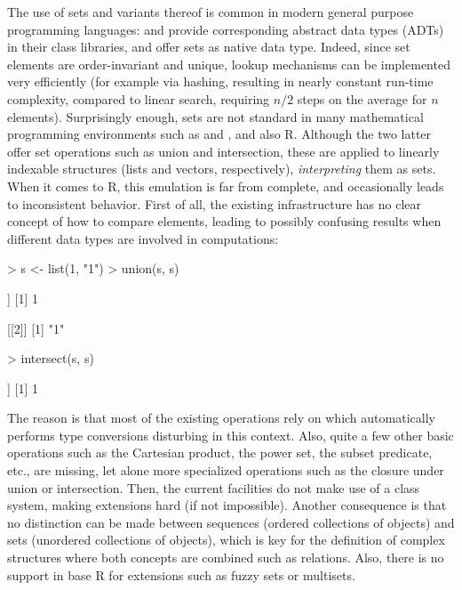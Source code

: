 \documentclass[article]{jss}
\newcommand\R{\textsf{R}}
\newcommand{\codefun}[1]{\code{#1()}}
\begin{document}
The use of sets and variants thereof is common in modern general purpose
programming languages:   and 
provide corresponding abstract data types (ADTs) in their class
libraries,  and 
offer sets as native data type.
Indeed, since set elements are order-invariant and unique,
lookup mechanisms can be implemented very efficiently (for example via
hashing, resulting in nearly constant run-time complexity, compared to linear
search, requiring $n/2$ steps on the average for $n$ elements).
Surprisingly enough, sets are not standard in many
mathematical programming environments such as  and
, and also \R. Although the two latter offer
set operations such as union and intersection, these are applied to
linearly indexable structures (lists and vectors, respectively),
\emph{interpreting} them as sets. When it comes to \R,
this emulation is far from complete, and occasionally leads to inconsistent
behavior. First of all, the existing infrastructure has no clear concept
of how to compare elements, leading to possibly confusing
results when different data types are involved in
computations:
\begin{Schunk}
\begin{Sinput}
> s <- list(1, "1")
> union(s, s)
\end{Sinput}
\begin{Soutput}
[[1]]
[1] 1

[[2]]
[1] "1"
\end{Soutput}
\begin{Sinput}
> intersect(s, s)
\end{Sinput}
\begin{Soutput}
[[1]]
[1] 1
\end{Soutput}
\end{Schunk}
The reason is that most of the existing operations rely on
\codefun{match} which automatically performs type conversions
disturbing in this context.
Also, quite a few other basic operations such as
the Cartesian product, the power set, the subset predicate, etc., are
missing, let alone more specialized operations such as
the closure under union or intersection.
Then, the current facilities do not make use of a class
system, making extensions hard (if not impossible).  Another consequence
is that no distinction can be made between sequences (ordered
collections of objects) and sets (unordered collections of objects),
which is key for the definition of complex structures
where both concepts are combined such as relations.
Also, there is no support in base \R{} for extensions such as fuzzy sets
or multisets.
\end{document}
